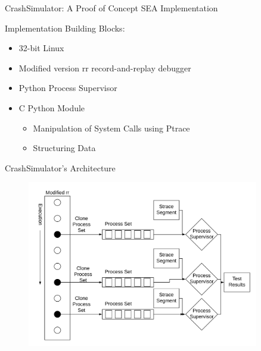 \documentclass[pdf]{beamer}
\begin{document}
\begin{frame}{CrashSimulator: A Proof of Concept SEA Implementation}

  Implementation Building Blocks:

  \begin{itemize}
    \item{32-bit Linux}
    \item{Modified version rr record-and-replay debugger}
    \item{Python Process Supervisor}
    \item{C Python Module}
      \begin{itemize}
        \item{Manipulation of System Calls using Ptrace}
        \item{Structuring Data}
      \end{itemize}
  \end{itemize}
\end{frame}


\begin{frame}{CrashSimulator's Architecture}
    \begin{figure}
    \centering
    \includegraphics[width = 0.9\textwidth]{images/architecture}
  \end{figure}
\end{frame}
\end{document}
